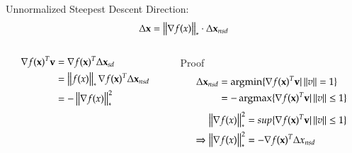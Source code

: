 \begin{frame}
{    Unnormalized Steepest Descent Direction:
    $$\Delta {\bf x} = \left\lVert\nabla f(x)\right\rVert_* \cdot \Delta {\bf x}_{nsd}$$
    \begin{columns}
      \begin{column}{0.4\textwidth}
        \footnotesize
        \begin{equation*}
          \label{eq:some}
          \begin{split}
            \nabla f({\bf x})^T{\bf v} & = \nabla f({\bf x})^T\Delta{\bf x}_{sd} \\
            & =\left\lVert f(x)\right\rVert_*\nabla f({\bf x})^T\Delta{\bf x}_{nsd} \\
            & = -\left\lVert\nabla f{(x)}\right\rVert^2_*
          \end{split}
        \end{equation*}
      \end{column}
      \begin{column}{0.6\textwidth}
        \footnotesize
        \begin{greenblock}{Proof}
          \begin{equation*}
            \begin{split}
              \Delta {\bf x}_{nsd} & = \operatorname*{argmin}\{\nabla f({\bf x})^T{\bf v} | \left\lVert v\right\rVert = 1\} \\
              & = - \operatorname*{argmax}\{\nabla f({\bf x})^T{\bf v} | \left\lVert v\right\rVert \le 1\}
            \end{split}
          \end{equation*}
          \begin{equation*}
            \begin{split}
              \left\lVert\nabla f{(x)}\right\rVert^2_* & = sup\{\nabla f({\bf x})^T{\bf v} |
              \left\lVert v\right\rVert \le 1 \} \\
              \Rightarrow \left\lVert\nabla f{(x)}\right\rVert^2_* & = -\nabla f({\bf x})^T\Delta x_{nsd}
            \end{split}
          \end{equation*}
        \end{greenblock}
      \end{column}
    \end{columns}

  }


\end{frame}



